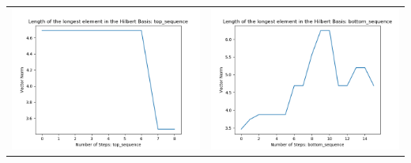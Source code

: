 \documentclass[10pt]{article}
\begin{document}
\begin{tabular}{c|c}
\begin{minipage}{.45\textwidth}
\includegraphics[width=\textwidth]{"DATA/4d/4 generators 2 bound D/top_sequence LENGTH"}
\end{minipage} &
\begin{minipage}{.45\textwidth}
\includegraphics[width=\textwidth]{"DATA/4d/4 generators 2 bound D bottomup/bottom_sequence LENGTH"}
\end{minipage}
\end{tabular}
\end{document}
